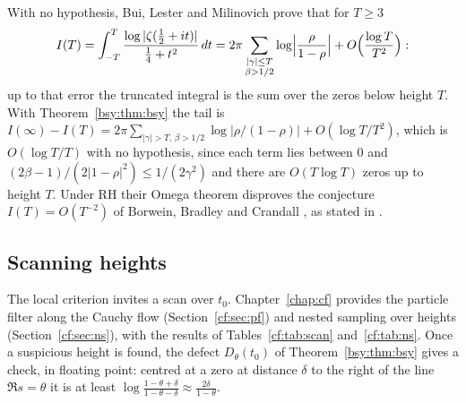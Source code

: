 With no hypothesis, Bui, Lester and Milinovich \cite[Theorem~1.2]{BLM14} prove that for $T\ge3$
\[
I(T)=\int_{-T}^T\frac{\log|\zeta(\frac12+it)|}{\frac14+t^2}\,dt=2\pi\sum_{\substack{|\gamma|\le T\\ \beta>1/2}}\log\Bigl|\frac{\rho}{1-\rho}\Bigr|+O\Bigl(\frac{\log T}{T^2}\Bigr):
\]
up to that error the truncated integral is the sum over the zeros below height $T$. With Theorem~\ref{bsy:thm:bsy} the tail is $I(\infty)-I(T)=2\pi\sum_{|\gamma|>T,\,\beta>1/2}\log|\rho/(1-\rho)|+O(\log T/T^2)$, which is $O(\log T/T)$ with no hypothesis, since each term lies between $0$ and $(2\beta-1)/(2|1-\rho|^2)\le1/(2\gamma^2)$ and there are $O(T\log T)$ zeros up to height $T$. Under RH their Omega theorem disproves the conjecture $I(T)=O(T^{-2})$ of Borwein, Bradley and Crandall \cite{BBC00}, as stated in \cite{BLM14}.

\subsection{Scanning heights}

The local criterion invites a scan over $t_0$. Chapter~\ref{chap:cf} provides the particle filter along the Cauchy flow (Section~\ref{cf:sec:pf}) and nested sampling over heights (Section~\ref{cf:sec:ns}), with the results of Tables~\ref{cf:tab:scan} and~\ref{cf:tab:ns}. Once a suspicious height is found, the defect $D_\theta(t_0)$ of Theorem~\ref{bsy:thm:bsy} gives a check, in floating point: centred at a zero at distance $\delta$ to the right of the line $\Re s=\theta$ it is at least $\log\frac{1-\theta+\delta}{1-\theta-\delta}\approx\frac{2\delta}{1-\theta}$.
